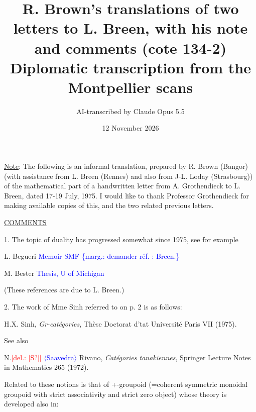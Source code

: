 \documentclass[11pt]{article}
\title{R. Brown's translations of two letters to L. Breen, with his note and comments (cote 134-2)\\[4pt]\large Diplomatic transcription from the Montpellier scans}
\author{AI-transcribed by Claude Opus 5.5}
\date{12 November 2026}
\newcommand{\scanpage}[1]{\par\bigskip\noindent{\small\sffamily[scan #1]}\par}
\newcommand{\mspage}[1]{{\small\sffamily[p.\,#1]}}
\newcommand{\hand}[1]{\textcolor{blue}{#1}}
\let\over\relax
\newcommand{\over}[2]{\textcolor{gray}{#1}\textcolor{blue}{\ensuremath{^{\!\nearrow}}#2}}
\newcommand{\inserted}[2][]{\textcolor{blue}{$\langle$#2$\rangle$}}
\newcommand{\margin}[1]{\textcolor{blue}{\{\textsf{marg.:} #1\}}}
\newcommand{\deleted}[1]{\textcolor{red}{[\textsf{del.:} #1]}}
\newcommand{\uline}[1]{\underline{#1}}
\newcommand{\unsure}[1]{[#1?]}
\begin{document}
\maketitle

\scanpage{134-2/115}
\uline{Note}: The following is an informal translation, prepared by R. Brown
(Bangor) (with assistance from L. Breen (Rennes) and also from J-L. Loday
(Strasbourg)) of the mathematical part of a handwritten letter from
A. Grothendieck to L. Breen, dated 17-19 July, 1975. I would like to
thank Professor Grothendieck for making available copies of this, and
the two related previous letters.

\mspage{\hand{116}}

\clearpage
\scanpage{134-2/117}
\uline{COMMENTS}

1. The topic of duality has progressed somewhat since 1975, see for
example

L. Begueri \hand{Memoir SMF}
\margin{demander réf. : Breen.}

M. Bester \hand{Thesis, U of Michigan}

(These references are due to L. Breen.)

2. The work of Mme Sinh referred to on p. 2 is as follows:

H.X. Sinh, \textit{Gr-catégories}, Thèse Doctorat d'\over{E}{É}tat Université Paris VII
(1975).

See also

N.\deleted{\unsure{S}} \inserted{Saavedra} Rivano, \textit{Catégories tanakiennes}, Springer Lecture
Notes in Mathematics 265 (1972).

Related to these notions is that of +-groupoid (=coherent
symmetric monoidal groupoid with strict associativity and strict
zero object) whose theory is developed also in:
\end{document}
